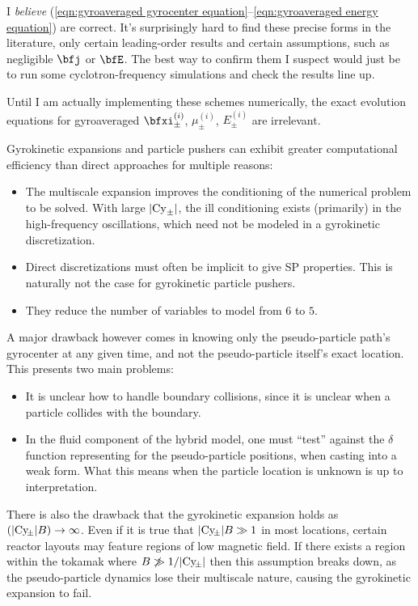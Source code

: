     \begin{remark}
        I \emph{believe} (\ref{eqn:gyroaveraged gyrocenter equation}--\ref{eqn:gyroaveraged energy equation}) are correct. It's surprisingly hard to find these precise forms in the literature, only certain leading-order results and certain assumptions, such as negligible $\bfj$ or $\bfE$. The best way to confirm them I suspect would just be to run some cyclotron-frequency simulations and check the results line up.
        
        Until I am actually implementing these schemes numerically, the exact evolution equations for gyroaveraged $\bfxi_{\pm}^{(i)}$, $\mu_{\pm}^{(i)}$, $E_{\pm}^{(i)}$ are irrelevant.
    \end{remark}

    \shortline

    Gyrokinetic expansions and particle pushers can exhibit greater computational efficiency than direct approaches for multiple reasons:
    \begin{itemize}
        \item  The multiscale expansion improves the conditioning of the numerical problem to be solved. With large $|\mathrm{Cy}_{\pm}|$, the ill conditioning exists (primarily) in the high-frequency oscillations, which need not be modeled in a gyrokinetic discretization.
        \item  Direct discretizations must often be implicit to give SP properties. This is naturally not the case for gyrokinetic particle pushers. 
        \item  They reduce the number of variables to model from $6$ to $5$.
    \end{itemize}

    A major drawback however comes in knowing only the pseudo-particle path's gyrocenter at any given time, and not the pseudo-particle itself's exact location. This presents two main problems:
    \begin{itemize}
        \item  It is unclear how to handle boundary collisions, since it is unclear when a particle collides with the boundary.
        \item  In the fluid component of the hybrid model, one must ``test'' against the $\delta$ function representing for the pseudo-particle positions, when casting into a weak form. What this means when the particle location is unknown is up to interpretation.
    \end{itemize}
    There is also the drawback that the gyrokinetic expansion holds as $(|\mathrm{Cy}\!_{\pm}|B) \rightarrow \infty$. Even if it is true that $|\mathrm{Cy}\!_{\pm}|B \gg 1$ in most locations, certain reactor layouts may feature regions of low magnetic field. If there exists a region within the tokamak where $B \not\gg 1/|\mathrm{Cy}\!_{\pm}|$ then this assumption breaks down, as the pseudo-particle dynamics lose their multiscale nature, causing the gyrokinetic expansion to fail.
